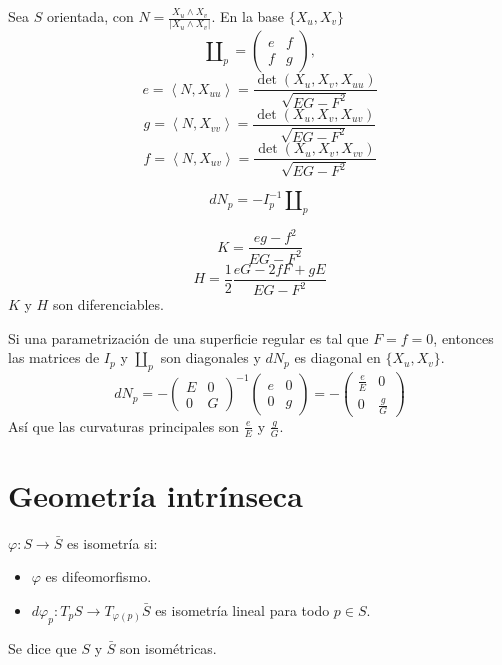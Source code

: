\begin{proposition}
    Sea $S$ orientada, con $N = \frac{X_u \land X_v}{|X_u \land X_v|}$. En la base $\{ X_u, X_v \}$
    $$\amalg_p =
        \begin{pmatrix}
            e & f \\
            f & g
        \end{pmatrix},$$
    $$e = \left\langle N, X_{uu} \right\rangle = \frac{\det(X_u, X_v, X_{uu})}{\sqrt{EG-F^2}}$$
    $$g = \left\langle N, X_{vv} \right\rangle = \frac{\det(X_u, X_v, X_{uv})}{\sqrt{EG-F^2}}$$
    $$f = \left\langle N, X_{uv} \right\rangle = \frac{\det(X_u, X_v, X_{vv})}{\sqrt{EG-F^2}}$$
\end{proposition}

\begin{proposition}
    $$dN_p = -I_p^{-1} \amalg_p$$
\end{proposition}

\begin{proposition}
    $$K = \frac{eg-f^2}{EG-F^2}$$
    $$H = \frac{1}{2} \frac{eG - 2fF + gE}{EG-F^2}$$
    $K$ y $H$ son diferenciables.
\end{proposition}

\begin{remark}
    Si una parametrización de una superficie regular es tal que $F = f = 0$, entonces las matrices de $I_p$ y $\amalg_p$ son diagonales y $dN_p$ es diagonal en $\{X_u, X_v\}$.
    $$dN_p = -
        \begin{pmatrix}
            E & 0 \\
            0 & G
        \end{pmatrix}^{-1}
        \begin{pmatrix}
            e & 0 \\
            0 & g
        \end{pmatrix} = -
        \begin{pmatrix}
            \frac{e}{E} & 0           \\
            0           & \frac{g}{G}
        \end{pmatrix}$$
    Así que las curvaturas principales son $\frac{e}{E}$ y $\frac{g}{G}$.
\end{remark}

\section{Geometría intrínseca}

\begin{definition}
    $\varphi : S \to \bar{S}$ es isometría si:
    \begin{itemize}
        \item $\varphi$ es difeomorfismo.
        \item $d\varphi_p : T_pS \to T_{\varphi(p)}\bar{S}$ es isometría lineal para todo $p \in S$.
    \end{itemize}
    Se dice que $S$ y $\bar{S}$ son isométricas.
\end{definition}

